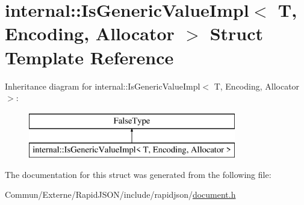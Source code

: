 \hypertarget{structinternal_1_1_is_generic_value_impl}{}\section{internal\+:\+:Is\+Generic\+Value\+Impl$<$ T, Encoding, Allocator $>$ Struct Template Reference}
\label{structinternal_1_1_is_generic_value_impl}
Inheritance diagram for internal\+:\+:Is\+Generic\+Value\+Impl$<$ T, Encoding, Allocator $>$\+:\begin{figure}[H]
\begin{center}
\leavevmode
\includegraphics[height=2.000000cm]{structinternal_1_1_is_generic_value_impl}
\end{center}
\end{figure}


The documentation for this struct was generated from the following file\+:\begin{DoxyCompactItemize}
\item 
Commun/\+Externe/\+Rapid\+J\+S\+O\+N/include/rapidjson/\hyperlink{document_8h}{document.\+h}\end{DoxyCompactItemize}
